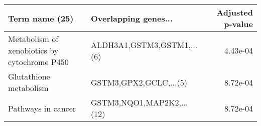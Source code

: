 \begin{tabular}{llr}
\toprule
                              Term name (25) &       Overlapping genes... &  Adjusted p-value \\
\midrule
Metabolism of xenobiotics by cytochrome P450 & ALDH3A1,GSTM3,GSTM1,...(6) &          4.43e-04 \\
                      Glutathione metabolism &     GSTM3,GPX2,GCLC,...(5) &          8.72e-04 \\
                          Pathways in cancer &  GSTM3,NQO1,MAP2K2,...(12) &          8.72e-04 \\
\bottomrule
\end{tabular}
